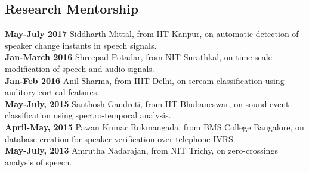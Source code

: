 \documentclass[line]{resume}
\begin{document}
{\begin{resume}
    \section{\mysidestyle Research Mentorship}
    \vspace{1mm}
       \textbf{May-July 2017} Siddharth Mittal, from IIT Kanpur, on automatic detection of speaker change instants in speech signals.\vspace{1mm}\\%
       \textbf{Jan-March 2016} Shreepad Potadar, from NIT Surathkal, on time-scale modification of speech and audio signals.\vspace{1mm}\\%
       \textbf{Jan-Feb 2016} Anil Sharma, from IIIT Delhi, on scream classification using auditory cortical features.\vspace{1mm}\\%
       \textbf{May-July, 2015} Santhosh Gandreti, from IIT Bhubaneswar, on sound event classification using spectro-temporal analysis.\vspace{1mm}\\%
       \textbf{April-May, 2015} Pawan Kumar Rukmangada, from BMS College Bangalore, on database creation for speaker verification over telephone IVRS.\vspace{1mm}\\%
       \textbf{May-July, 2013} Amrutha Nadarajan, from NIT Trichy, on zero-crossings analysis of speech.
    \vspace{-1.5mm}

\end{resume}}
\end{document}

